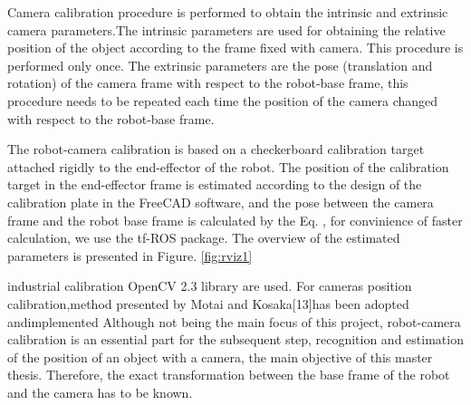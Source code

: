 Camera calibration procedure is performed to obtain the intrinsic and extrinsic camera parameters.The intrinsic parameters are used for obtaining the relative position of the object according to the frame fixed with camera. This procedure is performed only once. The extrinsic parameters are the pose (translation and rotation) of the camera frame with respect to the robot-base frame, this procedure needs to be repeated each time the position of the camera changed with respect to the robot-base frame. 


The robot-camera calibration is based on a checkerboard calibration target attached rigidly to the end-effector of the robot. The position of the calibration target in the end-effector frame is estimated according to the design of the calibration plate in the FreeCAD software, and the pose between the camera frame and the robot base frame is calculated by the Eq. , for convinience of faster calculation, we use the tf-ROS package. The overview of the estimated parameters is presented in Figure. \ref{fig:rviz1} 



industrial calibration OpenCV 2.3 library are used. For cameras position calibration,method presented by Motai and Kosaka[13]has been adopted andimplemented
Although not being the main focus of this project, robot-camera calibration is an essential part for the subsequent step, recognition and estimation of the position of an object with a camera, the main objective of this master thesis. Therefore, the exact transformation between the base frame of the robot and the camera has to be known. 

\fi




































